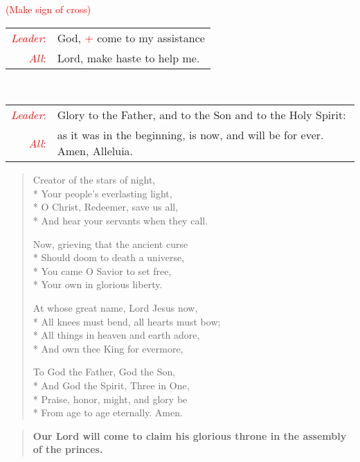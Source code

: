 \documentclass[letterpaper,14pt]{extarticle}
\newcommand{\side}[1]{\flagverse{\textcolor{red}{\textit{#1}}:}}
\newcommand{\sidestar}[1]{\textcolor{red}{\textit{#1}:}}
\newcommand{\rednote}[1]{\textcolor{red}{#1}}
\newlength{\oldindent}
\newcommand{\antiphon}[2]{
	\setlength{\oldindent}{\vindent}
	\setlength{\vindent}{0em}
	\begin{verse}
	\side{#1} \textbf{#2}
	\end{verse}
	\setlength{\vindent}{\oldindent}
}
\newcommand{\intercession}[2]{
	\begin{tabular}[h]{r p{4.25in}}
		\sidestar{Leader} & #1 \\
		\sidestar{All} & #2
	\end{tabular}}
\begin{document}
\hspace{\leftmargini}\rednote{(Make sign of cross)}\\
\intercession{God, \rednote{+} come to my assistance}
{Lord, make haste to help me.}\\
\intercession{Glory to the Father, and to the Son and to the Holy Spirit:}
{as it was in the beginning, is now, and will be for ever. Amen, Alleluia.}

\begin{verse}

	Creator of the stars of night, \\*
	Your people’s everlasting light, \\*
	O Christ, Redeemer, save us all, \\*
	And hear your servants when they call.
	
	Now, grieving that the ancient curse \\*
	Should doom to death a universe, \\*
	You came O Savior to set free, \\*
	Your own in glorious liberty.
	
	At whose great name, Lord Jesus now, \\*
	All knees must bend, all hearts must bow; \\*
	All things in heaven and earth adore, \\*
	And own thee King for evermore,
	
	To God the Father, God the Son, \\*
	And God the Spirit, Three in One, \\*
	Praise, honor, might, and glory be \\*
	From age to age eternally. Amen.
	
\end{verse}
\newpage
{}
\antiphon{Leader 1}{Our Lord will come to claim his glorious throne in the assembly of the princes.}
\end{document}
